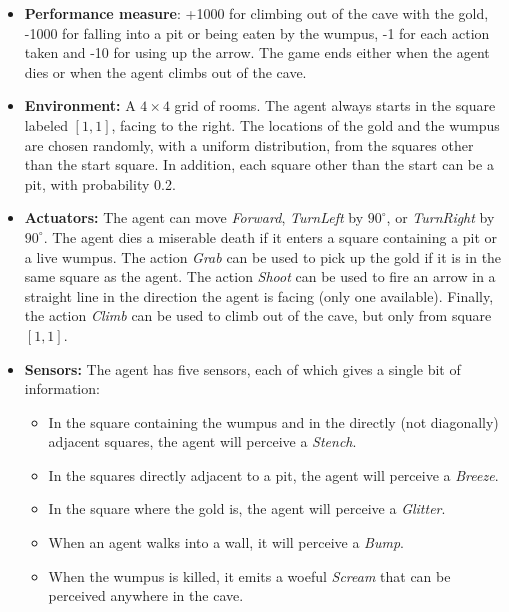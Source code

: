 \begin{itemize}
    \item \textbf{Performance measure}: +1000 for climbing out of the cave with the gold, -1000 for falling into a pit or being eaten by the wumpus, -1 for each action taken and -10 for using up the arrow. The game ends either when the agent dies or when the agent climbs out of the cave.

    \item \textbf{Environment:} A $4 \times 4$ grid of rooms. The agent always starts in the square labeled $[1,1]$, facing to the right. The locations of the gold and the wumpus are chosen randomly, with a uniform distribution, from the squares other than the start square. In addition, each square other than the start can be a pit, with probability 0.2.

    \item \textbf{Actuators:} The agent can move \textit{Forward}, \textit{TurnLeft} by $90^{\circ}$, or \textit{TurnRight} by $90^{\circ}$. The agent dies a miserable death if it enters a square containing a pit or a live wumpus. The action \textit{Grab} can be used to pick up the gold if it is in the same square as the agent. The action \textit{Shoot} can be used to fire an arrow in a straight line in the direction the agent is facing (only one available). Finally, the action \textit{Climb} can be used to climb out of the cave, but only from square $[1,1]$.

    \item \textbf{Sensors:} The agent has five sensors, each of which gives a single bit of information:
    \begin{itemize}
        \item In the square containing the wumpus and in the directly (not diagonally) adjacent squares, the agent will perceive a \textit{Stench}.

        \item In the squares directly adjacent to a pit, the agent will perceive a \textit{Breeze}.

        \item In the square where the gold is, the agent will perceive a \textit{Glitter}.

        \item When an agent walks into a wall, it will perceive a \textit{Bump}.

        \item  When the wumpus is killed, it emits a woeful \textit{Scream} that can be perceived anywhere in the cave.
    \end{itemize}
\end{itemize}
